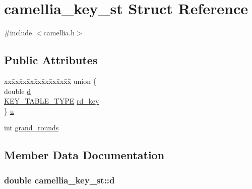 \hypertarget{structcamellia__key__st}{}\section{camellia\+\_\+key\+\_\+st Struct Reference}
\label{structcamellia__key__st}


{\ttfamily \#include $<$camellia.\+h$>$}

\subsection*{Public Attributes}
\begin{DoxyCompactItemize}
\item 
\begin{tabbing}
xx\=xx\=xx\=xx\=xx\=xx\=xx\=xx\=xx\=\kill
union \{\\
\>double \hyperlink{structcamellia__key__st_a00b2160265e9adb655a96fc196333950}{d}\\
\>\hyperlink{camellia_8h_a7fdfdeb07c85db8ec9c0edd180888805}{KEY\_TABLE\_TYPE} \hyperlink{structcamellia__key__st_a53f172c0118d018005c65e5c064f5587}{rd\_key}\\
\} \hyperlink{structcamellia__key__st_ae89f5c623cdae8e9288ff1392cd3e60d}{u}\\

\end{tabbing}\item 
int \hyperlink{structcamellia__key__st_ae0eb815e40c45d92126984b6645a7d96}{grand\+\_\+rounds}
\end{DoxyCompactItemize}


\subsection{Member Data Documentation}
\subsubsection[{\texorpdfstring{d}{d}}]{\setlength{\rightskip}{0pt plus 5cm}double camellia\+\_\+key\+\_\+st\+::d}\hypertarget{structcamellia__key__st_a00b2160265e9adb655a96fc196333950}{}\label{structcamellia__key__st_a00b2160265e9adb655a96fc196333950}
